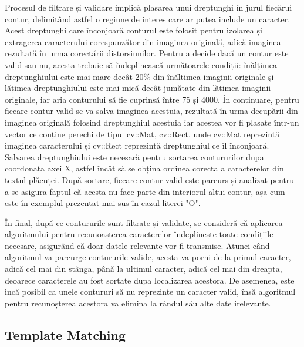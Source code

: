 \documentclass[12pt]{article}
\begin{document}
Procesul de filtrare și validare implic\u{a} plasarea unui dreptunghi \^{i}n jurul fiec\u{a}rui contur, delimit\^{a}nd astfel o regiune de interes care ar putea include un caracter. Acest dreptunghi care \^{i}nconjoar\u{a} conturul este folosit pentru izolarea și extragerea caracterului corespunz\u{a}tor din imaginea original\u{a}, adic\u{a} imaginea rezultat\u{a} \^{i}n urma corect\u{a}rii distorsiunilor. Pentru a decide dac\u{a} un contur este valid sau nu, acesta trebuie s\u{a} \^{i}ndeplineasc\u{a} urm\u{a}toarele condiții: \^{i}n\u{a}lțimea dreptunghiului este mai mare dec\^{a}t 20\% din \^{i}n\u{a}ltimea imaginii originale și l\u{a}țimea dreptunghiului este mai mic\u{a} dec\^{a}t jum\u{a}tate din l\u{a}țimea imaginii originale, iar aria conturului s\u{a} fie cuprins\u{a} \^{i}ntre 75 și 4000. \^{I}n continuare, pentru fiecare contur valid se va salva imaginea acestuia, rezultat\u{a} \^{i}n urma decup\u{a}rii din imaginea original\u{a} folosind dreptunghiul acestuia iar acestea vor fi plasate \^{i}ntr-un vector ce conține perechi de tipul cv::Mat, cv::Rect, unde cv::Mat reprezint\u{a} imaginea caracterului și cv::Rect reprezint\u{a} dreptunghiul ce \^{i}l \^{i}nconjoar\u{a}. Salvarea dreptunghiului este necesar\u{a} pentru sortarea contururilor dupa coordonata axei X, astfel \^{i}nc\^{a}t s\u{a} se obțina ordinea corect\u{a} a caracterelor din textul pl\u{a}cuței. Dup\u{a} sortare, fiecare contur valid este parcurs și analizat pentru a se asigura faptul c\u{a} acesta nu face parte din interiorul altui contur, așa cum este \^{i}n exemplul prezentat mai sus \^{i}n cazul literei "O".

\^{I}n final, dup\u{a} ce contururile sunt filtrate și validate, se consider\u{a} c\u{a} aplicarea algoritmului pentru recunoașterea caracterelor \^{i}ndeplinește toate condițiile necesare, asigur\^{a}nd c\u{a} doar datele relevante vor fi transmise. Atunci c\^{a}nd algoritmul va parcurge contururile valide, acesta va porni de la primul caracter, adic\u{a} cel mai din st\^{a}nga, p\^{a}n\u{a} la ultimul caracter, adic\u{a} cel mai din dreapta, deoarece caracterele au fost sortate dupa localizarea acestora. De asemenea, este inc\u{a} posibil ca unele contururi s\u{a} nu reprezinte un caracter valid, \^{i}ns\u{a} algoritmul pentru recunoșterea acestora va elimina la r\^{a}ndul s\u{a}u alte date irelevante.

\subsection{Template Matching}
\end{document}
